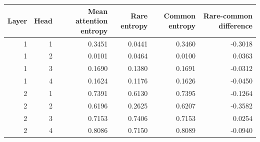 \begin{tabular}{rrrrrr}
\toprule
Layer & Head & Mean attention entropy & Rare entropy & Common entropy & Rare-common difference \\
\midrule
1 & 1 & 0.3451 & 0.0441 & 0.3460 & -0.3018 \\
1 & 2 & 0.0101 & 0.0464 & 0.0100 & 0.0363 \\
1 & 3 & 0.1690 & 0.1380 & 0.1691 & -0.0312 \\
1 & 4 & 0.1624 & 0.1176 & 0.1626 & -0.0450 \\
2 & 1 & 0.7391 & 0.6130 & 0.7395 & -0.1264 \\
2 & 2 & 0.6196 & 0.2625 & 0.6207 & -0.3582 \\
2 & 3 & 0.7153 & 0.7406 & 0.7153 & 0.0254 \\
2 & 4 & 0.8086 & 0.7150 & 0.8089 & -0.0940 \\
\bottomrule
\end{tabular}
